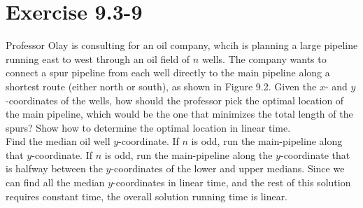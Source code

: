 \documentclass[10pt,a4paper]{article}
\begin{document}
\section*{Exercise 9.3-9}
Professor Olay is consulting for an oil company, whcih is planning a large pipeline running east to west through an oil field of $n$ wells. The company wants to connect a spur pipeline from each well directly to the main pipeline along a shortest route (either north or south), as shown in Figure 9.2. Given the $x$- and $y$-coordinates of the wells, how should the professor pick the optimal location of the main pipeline, which would be the one that minimizes the total length of the spurs? Show how to determine the optimal location in linear time.
\vspace*{\baselineskip}
\\
Find the median oil well $y$-coordinate. If $n$ is odd, run the main-pipeline along that $y$-coordinate. If $n$ is odd, run the main-pipeline along the $y$-coordinate that is halfway between the $y$-coordinates of the lower and upper medians. Since we can find all the median $y$-coordinates in linear time, and the rest of this solution requires constant time, the overall solution running time is linear.
\end{document}
